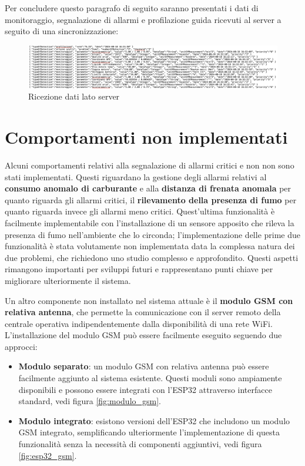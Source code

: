 \documentclass[12pt, a4paper, italian]{report}
\numberwithin{figure}{chapter}
\numberwithin{table}{chapter}
\begin{document}
Per concludere questo paragrafo di seguito saranno presentati i dati di monitoraggio, segnalazione di allarmi e profilazione guida ricevuti al server a seguito di una sincronizzazione:

\begin{figure}[h]
  \centering
  \includegraphics[width=16cm]{datiServer.png}
  \caption{Ricezione dati lato server}
  \label{fig:datiServer}
\end{figure}

\section{Comportamenti non implementati}
Alcuni comportamenti relativi alla segnalazione di allarmi critici e non non sono stati implementati. Questi riguardano la gestione degli allarmi relativi al \textbf{consumo anomalo di carburante} e alla \textbf{distanza di frenata anomala} per quanto riguarda gli allarmi critici, il \textbf{rilevamento della presenza di fumo} per quanto riguarda invece gli allarmi meno critici. Quest'ultima funzionalità è facilmente implementabile con l'installazione di un sensore apposito che rileva la presenza di fumo nell'ambiente che lo circonda; l'implementazione delle prime due funzionalità è stata volutamente non implementata data la complessa natura dei due problemi, che richiedono uno studio complesso e approfondito. Questi aspetti rimangono importanti per sviluppi futuri e rappresentano punti chiave per migliorare ulteriormente il sistema.

Un altro componente non installato nel sistema attuale è il \textbf{modulo GSM con relativa antenna}, che permette la comunicazione con il server remoto della centrale operativa indipendentemente dalla disponibilità di una rete WiFi.
L'installazione del modulo GSM può essere facilmente eseguito seguendo due approcci: 

\begin{itemize}
    \item \textbf{Modulo separato}: un modulo GSM con relativa antenna può essere facilmente aggiunto al sistema esistente. Questi moduli sono ampiamente disponibili e possono essere integrati con l'ESP32 attraverso interfacce standard, vedi figura  \ref{fig:modulo_gsm}.
    \item \textbf{Modulo integrato}: esistono versioni dell'ESP32 che includono un modulo GSM integrato, semplificando ulteriormente l'implementazione di questa funzionalità senza la necessità di componenti aggiuntivi, vedi figura \ref{fig:esp32_gsm}.
\end{itemize}
\end{document}
